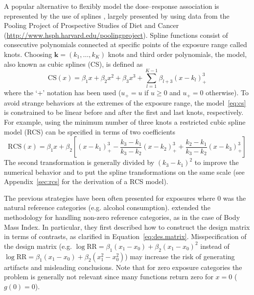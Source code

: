 \documentclass[11pt,a4paper,twoside,openany]{book}\usepackage{knitr}
\begin{document}
{{A popular alternative to flexibly model the dose--response association is represented by the use of splines \citep{de1978practical}, largely presented by \cite{orsini2011meta} using data from the Pooling Project of Prospective Studies of Diet and Cancer (\url{http://www.hsph.harvard.edu/poolingproject}). Spline functions consist of consecutive polynomials connected at specific points of the exposure range called knots. Choosing $\mathbf{k} = \left(k_1, \dots, k_K\right)$ knots and third order polynomials, the model, also known as cubic splines (CS), is defined as
\begin{equation}
\mathrm{CS}(x) = \beta_1 x + \beta_2x^2 + \beta_3x^3 + \sum_{l = 1}^{K-1} \beta_{l+3}(x - k_l)_{+}^3
\label{eq:cs}
\end{equation}
\noindent where the `+' notation has been used ($u_+ = u$ if $u \ge 0$ and $u_+ = 0$ otherwise). To avoid strange behaviors at the extremes of the exposure range, the model~\ref{eq:cs} is constrained to be linear before and after the first and last knots, respectively. For example, using the minimum number of three knots a restricted cubic spline model (RCS) can be specified in terms of two coefficients
\begin{equation}
\mathrm{RCS}(x) = \beta_1 x + \beta_2 \left[ \left( x - k_1 \right)_{+}^3 - \frac{k_3 - k_1}{k_3 - k_2} \left( x - k_2  \right)_{+}^3 + \frac{k_2 - k_1}{k_3 - k_2} \left(x - k_3 \right)_{+}^3\right]
\label{eq:rcs}
\end{equation}
\noindent The second transformation is generally divided by $(k_3 - k_1)^2$ to improve the numerical behavior and to put the spline transformations on the same scale \citep{harrell2015regression} (see Appendix~\ref{sec:rcs} for the derivation of a RCS model).

The previous strategies have been often presented for exposures where 0 was the natural reference categories (e.g. alcohol consumption). \cite{liu2009two} extended the methodology for handling non-zero reference categories, as in the case of Body Mass Index. In particular, they first described how to construct the design matrix in terms of contrasts, as clarified in Equation~\ref{eq:des.matrix}. Misspecification of the design matrix (e.g. $\log \mathrm{RR} = \beta_1 (x_1 - x_0) + \beta_2 (x_1 - x_0)^2$ instead of $\log \mathrm{RR} = \beta_1 (x_1 - x_0) + \beta_2 (x_1^2 - x_0^2)$) may increase the risk of generating artifacts and misleading conclusions. Note that for zero exposure categories the problem is generally not relevant since many functions return zero for $x = 0$ ($g(0) = 0$).

}}
\end{document}
